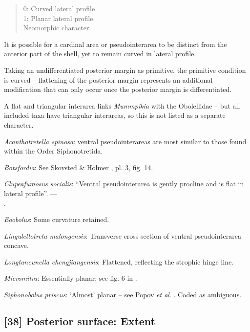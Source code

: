 \documentclass[openany]{book}
\theoremstyle{definition}
\theoremstyle{definition}
\theoremstyle{definition}
\theoremstyle{remark}
\begin{document}
\begin{quote}
0: Curved lateral profile\\
1: Planar lateral profile\\
Neomorphic character.
\end{quote}

It is possible for a cardinal area or pseudointerarea to be distinct
from the anterior part of the shell, yet to remain curved in lateral
profile.

Taking an undifferentiated posterior margin as primitive, the primitive
condition is curved -- flattening of the posterior margin represents an
additional modification that can only occur once the posterior margin is
differentiated.

A flat and triangular interarea links \emph{Mummpikia} with the
Obolellidae \citep{Balthasar2008iMummpikia} -- but all included taxa
have triangular interareas, so this is not listed as a separate
character.

\hypertarget{Acanthotretella_spinosa-coding-37}{}
\emph{Acanthotretella spinosa}: ventral pseudointerareas are most
similar to those found within the Order Siphonotretida.

\hypertarget{Botsfordia-coding-37}{}
\emph{Botsfordia}: See Skovsted \& Holmer
\citeyearpar{Skovsted2005EarlyCambrian}, pl. 3, fig. 14.

\hypertarget{Clupeafumosus_socialis-coding-37}{}
\emph{Clupeafumosus socialis}: ``Ventral pseudointerarea is gently
procline and is flat in lateral profile''. ---\\
\citep{Topper2013Reappraisalof}.

\hypertarget{Eoobolus-coding-37}{}
\emph{Eoobolus}: Some curvature retained.

\hypertarget{Lingulellotreta_malongensis-coding-37}{}
\emph{Lingulellotreta malongensis}: Transverse cross section of ventral
pseudointerarea concave.

\hypertarget{Longtancunella_chengjiangensis-coding-37}{}
\emph{Longtancunella chengjiangensis}: Flattened, reflecting the
strophic hinge line.

\hypertarget{Micromitra-coding-37}{}
\emph{Micromitra}: Essentially planar; see fig. 6 in
\citet{Ushatinskaya2016Protegulumand}.

\hypertarget{Siphonobolus_priscus-coding-37}{}
\emph{Siphonobolus priscus}: `Almost' planar -- see Popov \emph{et al}.
\citeyearpar[fig. 4]{Popov2009Earlyontogeny}. Coded as ambiguous.

\subsection*{{[}38{]} Posterior surface:
Extent}\label{posterior-surface-extent}
\end{document}
